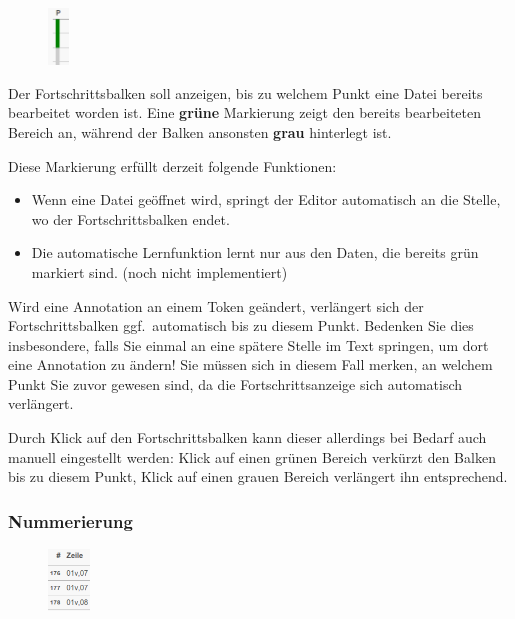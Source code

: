\documentclass[11pt,a4paper,parskip=half]{scrartcl}
\begin{document}
\begin{figure}
  \begin{center}\vspace{-2em}
    \includegraphics[width=0.05\textwidth]{img/progress.png}
  \end{center}
\end{figure}

Der Fortschrittsbalken soll anzeigen, bis zu welchem Punkt eine Datei
bereits bearbeitet worden ist.  Eine \textbf{grüne} Markierung zeigt
den bereits bearbeiteten Bereich an, während der Balken ansonsten
\textbf{grau} hinterlegt ist.

Diese Markierung erfüllt derzeit folgende Funktionen:
\begin{itemize}
\item Wenn eine Datei geöffnet wird, springt der Editor automatisch an
  die Stelle, wo der Fortschrittsbalken endet.
\item Die automatische Lernfunktion lernt nur aus den Daten, die
  bereits grün markiert sind. (noch nicht implementiert)
\end{itemize}

Wird eine Annotation an einem Token geändert, verlängert sich der
Fortschrittsbalken ggf.\ automatisch bis zu diesem Punkt.  Bedenken
Sie dies insbesondere, falls Sie einmal an eine spätere Stelle im Text
springen, um dort eine Annotation zu ändern!  Sie müssen sich in
diesem Fall merken, an welchem Punkt Sie zuvor gewesen sind, da die
Fortschrittsanzeige sich automatisch verlängert.

Durch Klick auf den Fortschrittsbalken kann dieser allerdings bei
Bedarf auch manuell eingestellt werden: Klick auf einen grünen Bereich
verkürzt den Balken bis zu diesem Punkt, Klick auf einen grauen
Bereich verlängert ihn entsprechend.


\subsubsection{Nummerierung}

\begin{figure}
  \begin{center}\vspace{-2em}
    \includegraphics[width=0.1\textwidth]{img/zeile.png}
  \end{center}
\end{figure}
\end{document}
